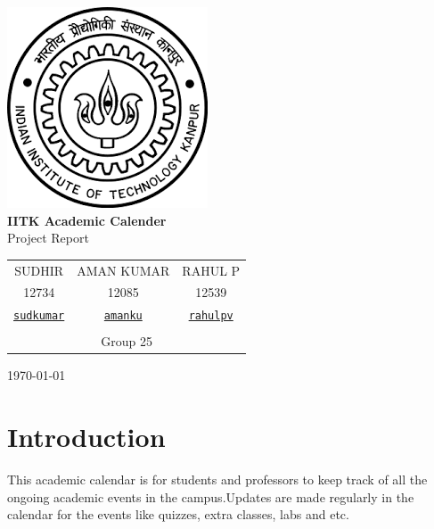 \documentclass[a4paper, 12pt]{article}
\begin{document}
\begin{titlepage}
\center
\includegraphics[scale=0.8]{logo.png}\\[1cm]
{\huge \bfseries IITK Academic Calender}\\[0.4cm]
\center
{\huge Project Report }
\center
\begin{tabular}{ccc}
	SUDHIR  & AMAN KUMAR & RAHUL P\\
	12734 & 12085 & 12539 \\
	\href{mailto:sudkumar@iitk.ac.in}{\nolinkurl{sudkumar}} &\href{mailto:amanku@iitk.ac.in}{\nolinkurl{amanku}} & \href{mailto:rahulpv@iitk.ac.in}{\nolinkurl{rahulpv}}\\ 
	\multicolumn{3}{c}{}\\
	\multicolumn{3}{c}{\large Group 25}
\end{tabular}
\center
\large \today\\[2cm]
\end{titlepage}
\newpage
\tableofcontents

\newpage
\begin{abstract}
An academic calendar for IITK community to see all their registered academic events.
\end{abstract}

\section{Introduction}
This academic calendar is for students and professors to keep track of all the ongoing academic events in the campus.Updates are made regularly
in the calendar for the events like quizzes, extra classes, labs and etc.
\end{document}
